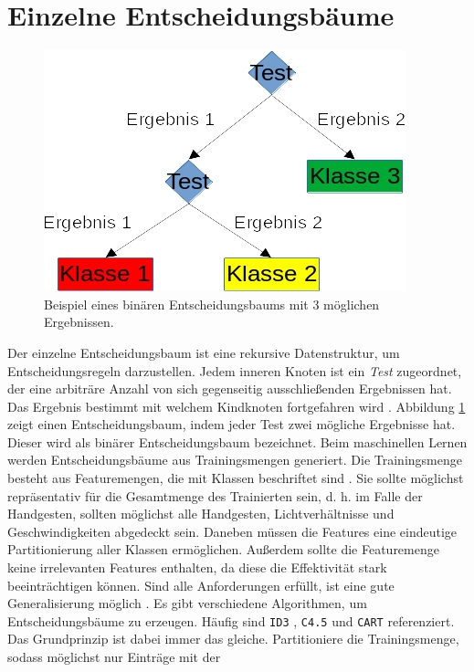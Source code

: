 \section{Einzelne Entscheidungsbäume}
\label{sec:construction}
\begin{figure}
    \centering
    \includegraphics[width=0.5\linewidth]{images/entscheidungsbaum.jpg}
    \caption{Beispiel eines binären Entscheidungsbaums mit 3 möglichen Ergebnissen.}
    \label{fig:entscheidungsbaum}
\end{figure}
Der einzelne Entscheidungsbaum ist eine rekursive Datenstruktur, um Entscheidungsregeln darzustellen. Jedem inneren Knoten ist ein \textit{Test} zugeordnet, der eine arbiträre Anzahl von sich gegenseitig
ausschließenden Ergebnissen hat. Das Ergebnis bestimmt mit welchem Kindknoten fortgefahren wird \cite{quinlan1990decision}. Abbildung \ref{fig:entscheidungsbaum} zeigt einen Entscheidungsbaum, indem jeder Test
zwei mögliche Ergebnisse hat. Dieser wird als binärer Entscheidungsbaum bezeichnet.
\newline
\newline
Beim maschinellen Lernen werden Entscheidungsbäume aus Trainingsmengen generiert. Die Trainingsmenge besteht aus Featuremengen, die mit Klassen beschriftet sind \cite{steinbergCART}. Sie sollte möglichst repräsentativ
für die Gesamtmenge des Trainierten sein, d. h. im Falle der Handgesten, sollten möglichst alle Handgesten, Lichtverhältnisse und Geschwindigkeiten abgedeckt sein. Daneben müssen die Features eine eindeutige
Partitionierung aller Klassen ermöglichen. Außerdem sollte die Featuremenge keine irrelevanten Features enthalten, da diese die Effektivität stark beeinträchtigen können. Sind alle Anforderungen erfüllt, ist eine
gute Generalisierung möglich \cite{pei1998feature}.
\newline
\newline
Es gibt verschiedene Algorithmen, um Entscheidungsbäume zu erzeugen. Häufig sind \texttt{ID3} \cite{quinlan1986induction}, \texttt{C4.5} \cite{quinlan2014c4}
und \texttt{CART} \cite{breiman1984classification} referenziert. Das Grundprinzip ist dabei immer das gleiche. Partitioniere die Trainingsmenge, sodass möglichst nur Einträge mit der

